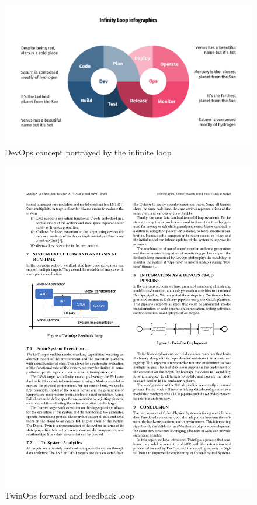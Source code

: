 \documentclass[journal,onecolumn]{IEEEtran} %
\begin{document}
\begin{figure}[hbt!]
  \centering
  \includegraphics[scale=0.6]{figures/devops.pdf}
  \caption{DevOps concept portrayed by the infinite loop}
  \label{fig:devops}
\end{figure}

\begin{figure}[hbt!]
  \centering
  \includegraphics[scale=1]{figures/twinopsloop.pdf}
  \caption{TwinOps forward and feedback loop \cite{Hugues2020}}
  \label{fig:twinopsloop}
\end{figure}
\end{document}
